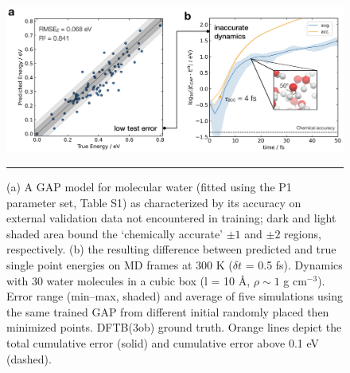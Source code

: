 \documentclass[../../main.tex]{subfiles}
\begin{document}
\begin{figure}[h!]
	\vspace{0.4cm}
	\centering
	\includegraphics[width=\textwidth]{6/gap/figs_si/fig1}
	\vspace{0.2cm}
	\hrule
	\caption{(a) A GAP model for molecular water (fitted using the P1 parameter set, Table S1) as characterized by its
accuracy on external validation data not encountered in training; dark and light shaded area bound the ‘chemically accurate’ $\pm1$ \kcalx and $\pm2$ \kcalx regions, respectively. (b) the resulting difference between predicted and true single point energies on MD frames at 300 K ($\delta t$ = 0.5 fs). Dynamics with 30 water molecules in a cubic box (l = 10 \AA, $\rho \sim 1$ g cm${}^{-3}$). Error range (min–max, shaded) and average of five simulations using the same trained GAP from different initial randomly placed then minimized points. DFTB(3ob) ground truth. Orange lines depict the total cumulative error (solid) and cumulative error above 0.1 eV (dashed).}
	\label{fig::ml_si_1}
\end{figure}
\end{document}
